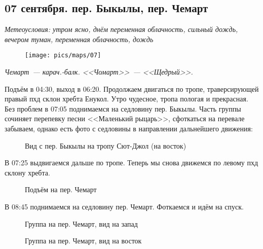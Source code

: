 \subsection{07 сентября. пер. Быкылы, пер. Чемарт}
\textit{Метеоусловия: утром ясно, днём переменная облачность, сильный дождь, вечером туман, переменная облачность, дождь}

\begin{figure}[h!]
	\centering
	\texttt{[image: pics/maps/07]}
	\label{fig:07}
\end{figure}

\textit{Чемарт~--- карач.-балк. <<Чомарт>>~--- <<Щедрый>>.}


Подъём в 04:30, выход в 06:20. Продолжаем двигаться по тропе, траверсирующей правый пхд склон хребта Енукол. Утро чудесное, тропа пологая и прекрасная. Без проблем в 07:05 поднимаемся на седловину пер. Быкылы. Часть группы сочиняет перепевку песни <<Маленький рыцарь>>, сфоткаться на перевале забываем, однако есть фото с седловины в направлении дальнейшего движения:

\begin{figure}[h!]
	\centering
	\caption{Вид с пер. Быкылы на тропу Сют-Джол (на восток)}
	\label{fig:bykyly}
\end{figure}


В 07:25 выдвигаемся дальше по тропе. Теперь мы снова движемся по левому пхд склону хребта.

\begin{figure}[h!]
	\centering
	\caption{Подъём на пер. Чемарт}
	\label{fig:toward_chemart}
\end{figure}

В 08:45 поднимаемся на седловину пер. Чемарт. Фоткаемся и идём на спуск.

\begin{figure}[h!]
	\centering
	\caption{Группа на пер. Чемарт, вид на запад}
	\label{fig:chemart_west}
\end{figure}


\begin{figure}[h!]
	\centering
	\caption{Группа на пер. Чемарт, вид на восток}
	\label{fig:chemart_east}
\end{figure}


